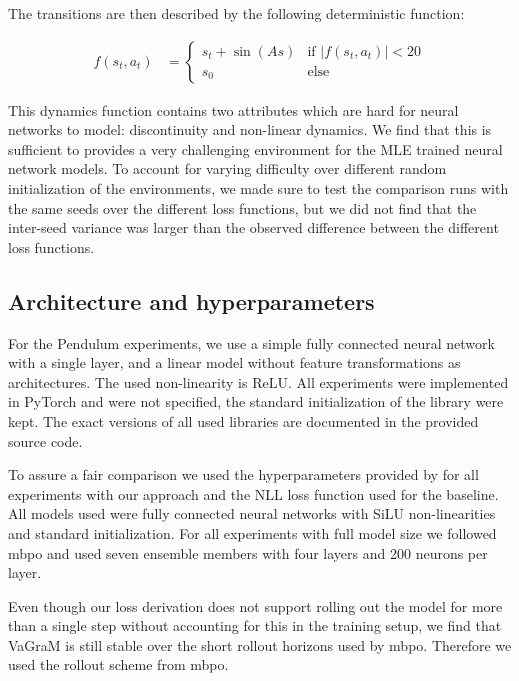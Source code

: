 The transitions are then described by the following deterministic function:

\begin{align}
    f(s_t,a_t) &= 
  \begin{cases}
    s_t + \sin(A s) & \text{if } |f(s_t,a_t)| < 20\\
    s_0 & \text{else}
  \end{cases}
\end{align}

This dynamics function contains two attributes which are hard for neural networks to model: discontinuity and non-linear dynamics.
We find that this is sufficient to provides a very challenging environment for the MLE trained neural network models.
To account for varying difficulty over different random initialization of the environments, we made sure to test the comparison runs with the same seeds over the different loss functions, but we did not find that the inter-seed variance was larger than the observed difference between the different loss functions.

\subsection{Architecture and hyperparameters}
For the Pendulum experiments, we use a simple fully connected neural network with a single layer, and a linear model without feature transformations as architectures.
The used non-linearity is ReLU.
All experiments were implemented in PyTorch \parencite{pytorch} and were not specified, the standard initialization of the library were kept.
The exact versions of all used libraries are documented in the provided source code.

To assure a fair comparison we used the hyperparameters provided by \textcite{mbpo} for all experiments with our approach and the NLL loss function used for the baseline.
All models used were fully connected neural networks with SiLU non-linearities and standard initialization.
For all experiments with full model size we followed \ac{mbpo} and used seven ensemble members with four layers and 200 neurons per layer.

Even though our loss derivation does not support rolling out the model for more than a single step without accounting for this in the training setup, we find that VaGraM is still stable over the short rollout horizons used by \ac{mbpo}.
Therefore we used the rollout scheme from \ac{mbpo}.

